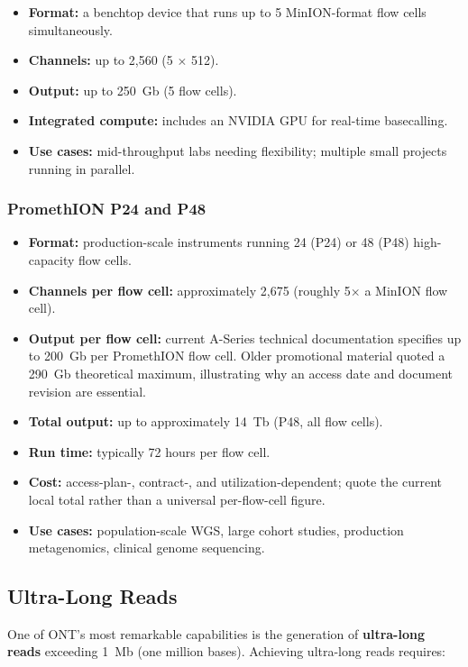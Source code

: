 \begin{itemize}[nosep]
  \item \textbf{Format:} a benchtop device that runs up to 5 MinION-format flow cells simultaneously.
  \item \textbf{Channels:} up to 2{,}560 (5 $\times$ 512).
  \item \textbf{Output:} up to 250~Gb (5 flow cells).
  \item \textbf{Integrated compute:} includes an NVIDIA GPU for real-time basecalling.
  \item \textbf{Use cases:} mid-throughput labs needing flexibility; multiple small projects running in parallel.
\end{itemize}

\subsubsection{PromethION P24 and P48}

\begin{itemize}[nosep]
  \item \textbf{Format:} production-scale instruments running 24 (P24) or 48 (P48) high-capacity flow cells.
  \item \textbf{Channels per flow cell:} approximately 2{,}675 (roughly 5$\times$ a MinION flow cell).
  \item \textbf{Output per flow cell:} current A-Series technical documentation specifies up to 200~Gb per PromethION flow cell. Older promotional material quoted a 290~Gb theoretical maximum, illustrating why an access date and document revision are essential.
  \item \textbf{Total output:} up to approximately 14~Tb (P48, all flow cells).
  \item \textbf{Run time:} typically 72 hours per flow cell.
  \item \textbf{Cost:} access-plan-, contract-, and utilization-dependent; quote the current local total rather than a universal per-flow-cell figure.
  \item \textbf{Use cases:} population-scale \gls{WGS}, large cohort studies, production metagenomics, clinical genome sequencing.
\end{itemize}

\subsection{Ultra-Long Reads}

One of ONT's most remarkable capabilities is the generation of \textbf{ultra-long reads} exceeding 1~Mb (one million bases). Achieving ultra-long reads requires:

